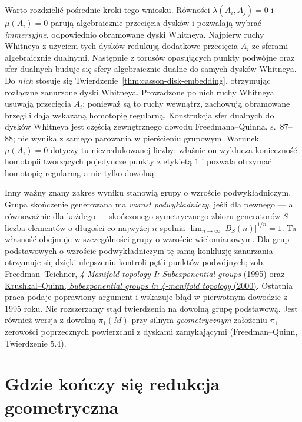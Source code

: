 Warto rozdzielić pośrednie kroki tego wniosku.
Równości $\lambda(A_i,A_j)=0$ i $\mu(A_i)=0$
parują algebraicznie przecięcia dysków i pozwalają
wybrać \emph{immersyjne}, odpowiednio obramowane
dyski Whitneya. Najpierw ruchy Whitneya
z użyciem tych dysków
redukują dodatkowe przecięcia $A_i$ ze sferami
algebraicznie dualnymi. Następnie z torusów
opasujących punkty podwójne oraz sfer dualnych
buduje się sfery algebraicznie dualne do samych
dysków Whitneya. Do \emph{nich} stosuje się
Twierdzenie~\ref{thm:casson-disk-embedding},
otrzymując rozłączne zanurzone dyski Whitneya.
Prowadzone po nich ruchy Whitneya usuwają
przecięcia $A_i$; ponieważ są to ruchy wewnątrz,
zachowują obramowane brzegi i dają wskazaną
homotopię regularną. Konstrukcja sfer dualnych
do dysków Whitneya jest częścią zewnętrznego
dowodu Freedmana--Quinna, s.\ 87--88; nie wynika
z samego parowania w pierścieniu grupowym.
Warunek $\mu(A_i)=0$ dotyczy tu niezredukowanej
liczby: właśnie on wyklucza konieczność homotopii
tworzących pojedyncze punkty z etykietą $1$ i pozwala
otrzymać homotopię regularną, a nie tylko dowolną.

Inny ważny znany zakres wyniku stanowią grupy o
wzroście podwykładniczym. Grupa skończenie generowana
ma \emph{wzrost podwykładniczy}, jeśli dla pewnego ---
a równoważnie dla każdego --- skończonego symetrycznego
zbioru generatorów $S$
liczba elementów o długości co najwyżej $n$
spełnia $\lim_{n\to\infty}|B_S(n)|^{1/n}=1$.
Ta własność obejmuje w szczególności grupy
o wzroście wielomianowym. Dla grup podstawowych
o wzroście podwykładniczym tę samą konkluzję
zanurzania otrzymuje się dzięki ulepszeniu
kontroli pętli punktów podwójnych; zob.
\href{https://math.berkeley.edu/~teichner/Papers/Freedman1.pdf}
{Freedman--Teichner, \emph{4-Manifold topology I:
Subexponential groups} (1995)} oraz
\href{https://uva.theopenscholar.com/files/slava-krushkal/files/subexponential_groups.pdf}
{Krushkal--Quinn, \emph{Subexponential groups in
4-manifold topology} (2000)}. Ostatnia praca
podaje poprawiony argument i wskazuje błąd
w pierwotnym dowodzie z 1995 roku. Nie
rozszerzamy stąd twierdzenia na dowolną grupę
podstawową. Jest również wersja z dowolną
$\pi_1(M)$ przy silnym \emph{geometrycznym}
założeniu $\pi_1$-zerowości poprzecznych
powierzchni z dyskami zamykającymi
(Freedman--Quinn, Twierdzenie 5.4).

\section{Gdzie kończy się redukcja geometryczna}
\label{sec:casson-boundary}

